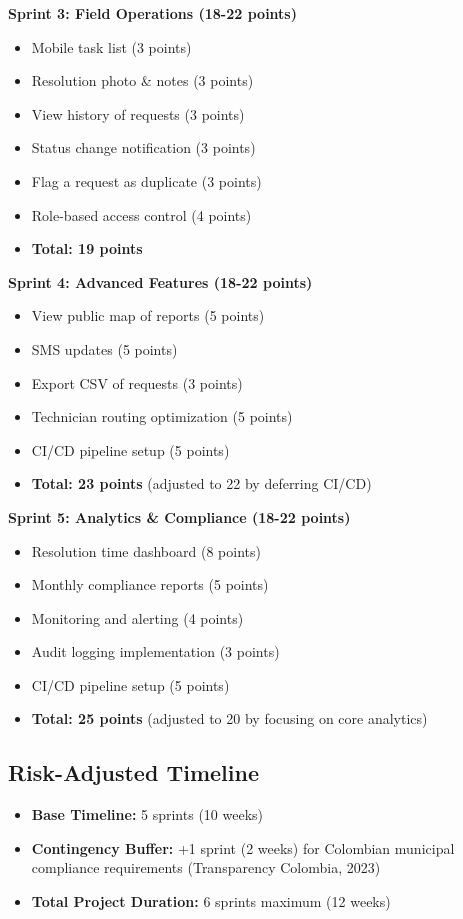 \documentclass[12pt,a4paper]{article}
\begin{document}
\textbf{Sprint 3: Field Operations (18-22 points)}
\begin{itemize}
    \item Mobile task list (3 points)
    \item Resolution photo \& notes (3 points)
    \item View history of requests (3 points)
    \item Status change notification (3 points)
    \item Flag a request as duplicate (3 points)
    \item Role-based access control (4 points)
    \item \textbf{Total: 19 points}
\end{itemize}

\textbf{Sprint 4: Advanced Features (18-22 points)}
\begin{itemize}
    \item View public map of reports (5 points)
    \item SMS updates (5 points)
    \item Export CSV of requests (3 points)
    \item Technician routing optimization (5 points)
    \item CI/CD pipeline setup (5 points)
    \item \textbf{Total: 23 points} (adjusted to 22 by deferring CI/CD)
\end{itemize}

\textbf{Sprint 5: Analytics \& Compliance (18-22 points)}
\begin{itemize}
    \item Resolution time dashboard (8 points)
    \item Monthly compliance reports (5 points)
    \item Monitoring and alerting (4 points)
    \item Audit logging implementation (3 points)
    \item CI/CD pipeline setup (5 points)
    \item \textbf{Total: 25 points} (adjusted to 20 by focusing on core analytics)
\end{itemize}

\subsection{Risk-Adjusted Timeline}

\begin{itemize}
    \item \textbf{Base Timeline:} 5 sprints (10 weeks)
    \item \textbf{Contingency Buffer:} +1 sprint (2 weeks) for Colombian municipal compliance requirements (Transparency Colombia, 2023)
    \item \textbf{Total Project Duration:} 6 sprints maximum (12 weeks)
\end{itemize}
\end{document}
